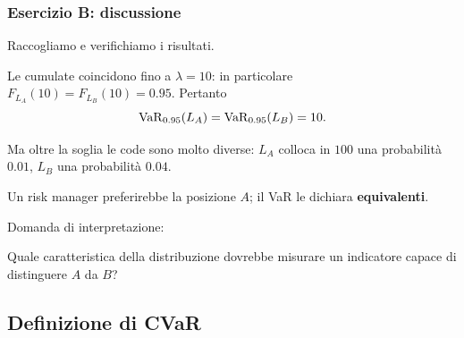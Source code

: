 \begin{frame}%
%

\frametitle{Esercizio B: discussione}%
%

%


Raccogliamo e verifichiamo i risultati.

\medskip

\begin{stepitemize}


\item Le cumulate coincidono fino a $\lambda=10$: in particolare $F_{L_{A}%
}(10)=F_{L_{B}}(10)=0.95$. Pertanto
\[
\operatorname{VaR}_{0.95}(L_{A}) = \operatorname{VaR}_{0.95}(L_{B}) = 10.
\]


\item Ma oltre la soglia le code sono molto diverse: $L_{A}$ colloca in $100$
una probabilit\`{a} $0.01$, $L_{B}$ una probabilit\`{a} $0.04$.

\item Un risk manager preferirebbe la posizione $A$; il VaR le dichiara
\textbf{equivalenti}.
\end{stepitemize}

\medskip

Domanda di interpretazione:

\begin{stepitemize}
\item Quale caratteristica della distribuzione dovrebbe misurare un indicatore
capace di distinguere $A$ da $B$?
\end{stepitemize}

%

\transboxout
\end{frame}%




\subsection{Definizione di CVaR}%

